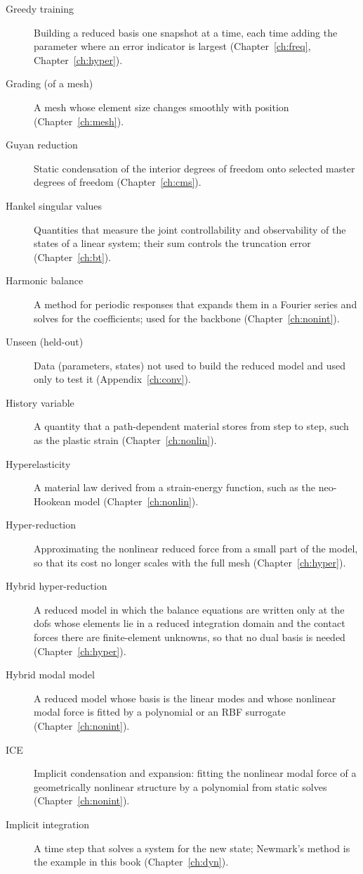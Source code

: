 \begin{description}
\item[Greedy training] Building a reduced basis one snapshot at a time, each time adding the parameter where an error indicator is largest (Chapter~\ref{ch:freq}, Chapter~\ref{ch:hyper}).
\item[Grading (of a mesh)] A mesh whose element size changes smoothly with position (Chapter~\ref{ch:mesh}).
\item[Guyan reduction] Static condensation of the interior degrees of freedom onto selected master degrees of freedom (Chapter~\ref{ch:cms}).
\item[Hankel singular values] Quantities that measure the joint controllability and observability of the states of a linear system; their sum controls the truncation error (Chapter~\ref{ch:bt}).
\item[Harmonic balance] A method for periodic responses that expands them in a Fourier series and solves for the coefficients; used for the backbone (Chapter~\ref{ch:nonint}).
\item[Unseen (held-out)] Data (parameters, states) not used to build the reduced model and used only to test it (Appendix~\ref{ch:conv}).
\item[History variable] A quantity that a path-dependent material stores from step to step, such as the plastic strain (Chapter~\ref{ch:nonlin}).
\item[Hyperelasticity] A material law derived from a strain-energy function, such as the neo-Hookean model (Chapter~\ref{ch:nonlin}).
\item[Hyper-reduction] Approximating the nonlinear reduced force from a small part of the model, so that its cost no longer scales with the full mesh (Chapter~\ref{ch:hyper}).
\item[Hybrid hyper-reduction] A reduced model in which the balance equations are written only at the dofs whose elements lie in a reduced integration domain and the contact forces there are finite-element unknowns, so that no dual basis is needed (Chapter~\ref{ch:hyper}).
\item[Hybrid modal model] A reduced model whose basis is the linear modes and whose nonlinear modal force is fitted by a polynomial or an RBF surrogate (Chapter~\ref{ch:nonint}).
\item[ICE] Implicit condensation and expansion: fitting the nonlinear modal force of a geometrically nonlinear structure by a polynomial from static solves (Chapter~\ref{ch:nonint}).
\item[Implicit integration] A time step that solves a system for the new state; Newmark's method is the example in this book (Chapter~\ref{ch:dyn}).

\end{description}

